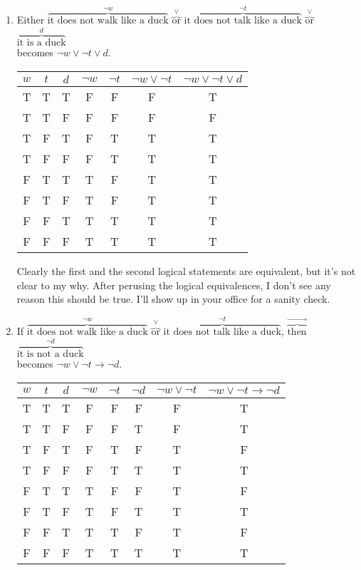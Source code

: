 \documentclass[12pt]{article}
\begin{document}
\begin{enumerate}
\begin{enumerate}
  \item Either $\overbrace{\text{it does not walk like a duck}}^{\neg w}$ $\overbrace{\text{or}}^{\vee}$ $\overbrace{\text{it does not talk like a duck}}^{\neg t}$ $\overbrace{\text{or}}^{\vee}$ $\overbrace{\text{it is a duck}}^{d}$ \\becomes $\neg w \vee \neg t \vee d $.\\[\baselineskip]
\begin{tabular} {|c|c|c||c|c|c|c|}
\hline
$w$ & $t$ & $d$  & $\neg w$ & $\neg t$ & $\neg w \vee \neg t$ & $\neg w \vee \neg t \vee d$\\ \hline
T & T & T & F & F & F & T\\
T & T & F & F & F & F & F\\
T & F & T & F & T & T & T\\
T & F & F & F & T & T & T\\
F & T & T & T & F & T & T\\
F & T & F & T & F & T & T\\
F & F & T & T & T & T & T\\
F & F & F & T & T & T & T\\ \hline
\end{tabular}
Clearly the first and the second logical statements are equivalent, but it's not clear to my why. After perusing the logical equivalences, I don't see any reason this should be true. I'll show up in your office for a sanity check.
  \item If $\overbrace{\text{it does not walk like a duck}}^{\neg w}$ $\overbrace{\text{or}}^{\vee}$ $\overbrace{\text{it does not talk like a duck}}^{\neg t}$, $\overbrace{\text{then}}^{\rightarrow}$ $\overbrace{\text{it is not a duck}}^{\neg d}$\\becomes $\neg w \vee \neg t \rightarrow \neg d$.\\[\baselineskip]
\begin{tabular} {|c|c|c||c|c|c|c|c|}
\hline
$w$ & $t$ & $d$  & $\neg w$ & $\neg t$ & $\neg d$ & $\neg w \vee \neg t$ & $\neg w \vee \neg t \rightarrow \neg d$\\ \hline
T & T & T & F & F & F & F & T\\
T & T & F & F & F & T & F & T\\
T & F & T & F & T & F & T & F\\
T & F & F & F & T & T & T & T\\
F & T & T & T & F & F & T & F\\
F & T & F & T & F & T & T & T\\
F & F & T & T & T & F & T & F\\
F & F & F & T & T & T & T & T\\ \hline
\end{tabular}


\end{enumerate}
\end{enumerate}
\end{document}
